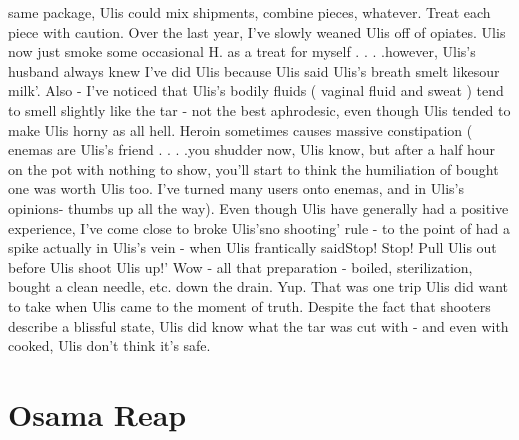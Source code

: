 \documentclass[12pt]{book}
\begin{document}
same package, Ulis could mix shipments, combine pieces, whatever. Treat each piece with caution. Over the last year, I've slowly weaned Ulis off of opiates. Ulis now just smoke some occasional H. as a treat for myself . . .  .however, Ulis's husband always knew I've did Ulis because Ulis said Ulis's breath smelt likesour milk'. Also - I've noticed that Ulis's bodily fluids ( vaginal fluid and sweat ) tend to smell slightly like the tar - not the best aphrodesic, even though Ulis tended to make Ulis horny as all hell. Heroin sometimes causes massive constipation ( enemas are Ulis's friend . . .  .you shudder now, Ulis know, but after a half hour on the pot with nothing to show, you'll start to think the humiliation of bought one was worth Ulis too. I've turned many users onto enemas, and in Ulis's opinions- thumbs up all the way). Even though Ulis have generally had a positive experience, I've come close to broke Ulis'sno shooting' rule - to the point of had a spike actually in Ulis's vein - when Ulis frantically saidStop! Stop! Pull Ulis out before Ulis shoot Ulis up!' Wow - all that preparation - boiled, sterilization, bought a clean needle, etc. down the drain. Yup. That was one trip Ulis did want to take when Ulis came to the moment of truth. Despite the fact that shooters describe a blissful state, Ulis did know what the tar was cut with - and even with cooked, Ulis don't think it's safe.



\chapter{Osama Reap}
\end{document}
